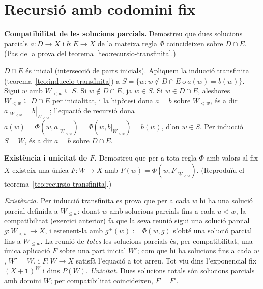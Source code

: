 \section{Recursió amb codomini fix}\label{prac:recursio-fix}

\begin{exercici}
\textbf{Compatibilitat de les solucions parcials.} Demostreu que dues solucions parcials \(a\colon D\to X\) i \(b\colon E\to X\) de la mateixa regla \(\Phi\) coincideixen sobre \(D\cap E\). (Pas de la prova del teorema~\ref{teo:recursio-transfinita}.)
\end{exercici}
\begin{solucio}
\(D\cap E\) és inicial (intersecció de parts inicials). Apliquem la inducció transfinita (teorema~\ref{teo:induccio-transfinita}) a \(S=\{w : w\notin D\cap E\ \text{o}\ a(w)=b(w)\}\). Sigui \(w\) amb \(W_{<w}\subseteq S\). Si \(w\notin D\cap E\), ja \(w\in S\). Si \(w\in D\cap E\), aleshores \(W_{<w}\subseteq D\cap E\) per inicialitat, i la hipòtesi dona \(a=b\) sobre \(W_{<w}\), és a dir \(a|_{W_{<w}}=b|_{W_{<w}}\); l'equació de recursió dona \(a(w)=\Phi(w,a|_{W_{<w}})=\Phi(w,b|_{W_{<w}})=b(w)\), d'on \(w\in S\). Per inducció \(S=W\), és a dir \(a=b\) sobre \(D\cap E\).
\end{solucio}

\begin{exercici}
\textbf{Existència i unicitat de \(F\).} Demostreu que per a tota regla \(\Phi\) amb valors al fix \(X\) existeix una única \(F\colon W\to X\) amb \(F(w)=\Phi(w,F|_{W_{<w}})\). (Reproduïu el teorema~\ref{teo:recursio-transfinita}.)
\end{exercici}
\begin{solucio}
\emph{Existència.} Per inducció transfinita es prova que per a cada \(w\) hi ha una solució parcial definida a \(W_{\le w}\): donat \(w\) amb solucions parcials fins a cada \(u<w\), la compatibilitat (exercici anterior) fa que la seva reunió sigui una solució parcial \(g\colon W_{<w}\to X\), i estenent-la amb \(g^+(w):=\Phi(w,g)\) s'obté una solució parcial fins a \(W_{\le w}\). La reunió de \emph{totes} les solucions parcials és, per compatibilitat, una única aplicació \(F\) sobre una part inicial \(W'\); com que hi ha solucions fins a cada \(w\), \(W'=W\), i \(F\colon W\to X\) satisfà l'equació a tot arreu. Tot viu dins l'exponencial fix \((X+\mathbf1)^W\) i dins \(P(W)\). \emph{Unicitat.} Dues solucions totals són solucions parcials amb domini \(W\); per compatibilitat coincideixen, \(F=F'\).
\end{solucio}

